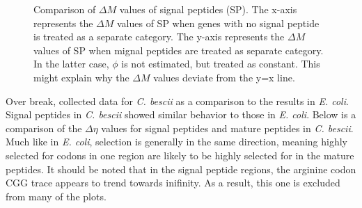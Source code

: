 \documentclass[11pt]{labbook}
\begin{document}
\begin{figure}[H]
\caption{Comparison of $\Delta\mathit{M}$ values of signal peptides (SP). The x-axis represents the $\Delta\mathit{M}$ values of SP when genes with no signal peptide is treated as a separate category. The y-axis represents the $\Delta\mathit{M}$ values of SP when mignal peptides are treated as separate category. In the latter case, $\phi$ is not estimated, but treated as constant. This might explain why the $\Delta\mathit{M}$ values deviate from the y=x line.}
\end{figure}


Over break, collected data for \textit{C. bescii} as a comparison to the results in \textit{E. coli}. Signal peptides in \textit{C. bescii} showed similar behavior to those in \textit{E. coli}. Below is a comparison of the $\Delta\eta$ values for signal peptides and mature peptides in \textit{C. bescii}. Much like in \textit{E. coli}, selection is generally in the same direction, meaning highly selected for codons in one region are likely to be highly selected for in the mature peptides. It should be noted that in the signal peptide regions, the arginine codon CGG trace appears to trend towards inifinity. As a result, this one is excluded from many of the plots. 
\end{document}

